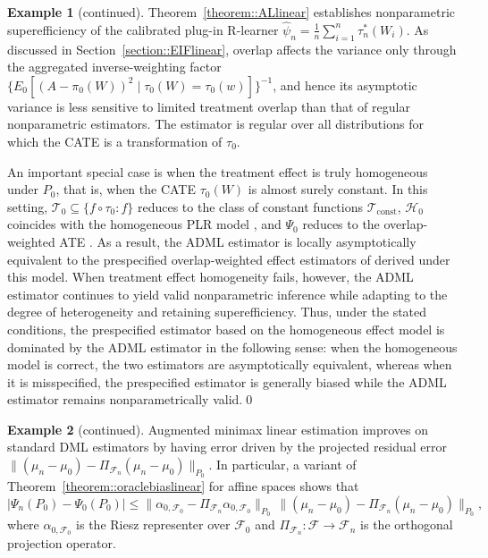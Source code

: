 \documentclass[11pt]{article}
\theoremstyle{definition}
\newtheorem{example}{Example}
\begin{document}
 
\begin{example}[continued]
Theorem~\ref{theorem::ALlinear} establishes nonparametric superefficiency of the calibrated plug-in R-learner \(\widehat{\psi}_n = \frac{1}{n}\sum_{i=1}^n \tau_n^*(W_i)\). As discussed in Section~\ref{section::EIFlinear}, overlap affects the variance only through the aggregated inverse-weighting factor \(\{E_0[(A-\pi_0(W))^2 \mid \tau_0(W)=\tau_0(w)]\}^{-1}\), and hence its asymptotic variance is less sensitive to limited treatment overlap than that of regular nonparametric estimators. The estimator is regular over all distributions for which the CATE is a transformation of \(\tau_0\).



An important special case is when the treatment effect is truly homogeneous under \(P_0\), that is, when the CATE \(\tau_0(W)\) is almost surely constant. In this setting, \(\mathcal{T}_0 \subseteq \{f \circ \tau_0 : f\}\) reduces to the class of constant functions \(\mathcal{T}_{\mathrm{const}}\), \(\mathcal{H}_0\) coincides with the homogeneous PLR model \citep{robinson1988root}, and \(\Psi_0\) reduces to the overlap-weighted ATE \citep{imbensOverlapEstimand2006, li2019overlapWeights}. As a result, the ADML estimator is locally asymptotically equivalent to the prespecified overlap-weighted effect estimators of \cite{robinson1988root,imbensOverlapEstimand2006, li2019overlapWeights} derived under this model. When treatment effect homogeneity fails, however, the ADML estimator continues to yield valid nonparametric inference while adapting to the degree of heterogeneity and retaining superefficiency. Thus, under the stated conditions, the prespecified estimator based on the homogeneous effect model is dominated by the ADML estimator in the following sense: when the homogeneous model is correct, the two estimators are asymptotically equivalent, whereas when it is misspecified, the prespecified estimator is generally biased while the ADML estimator remains nonparametrically valid.\qed
\end{example}
  

\begin{example}[continued]
Augmented minimax linear estimation improves on standard DML estimators by having error driven by the projected residual error $\|(\mu_n - \mu_0) - \Pi_{\mathcal{F}_n}(\mu_n - \mu_0)\|_{P_0}$. In particular, a variant of Theorem~\ref{theorem::oraclebiaslinear} for affine spaces shows that
\[
|\Psi_n(P_0) - \Psi_0(P_0)| \leq
\|\alpha_{0,\mathcal{F}_0} - \Pi_{\mathcal{F}_n}\alpha_{0,\mathcal{F}_0}\|_{P_0}
\,
\|(\mu_n - \mu_0) - \Pi_{\mathcal{F}_n}(\mu_n - \mu_0)\|_{P_0},
\]
where $\alpha_{0,\mathcal{F}_0}$ is the Riesz representer over $\mathcal{F}_0$ and $\Pi_{\mathcal{F}_n} : \mathcal{F} \to \mathcal{F}_n$ is the orthogonal projection operator.
\end{example}
\end{document}
